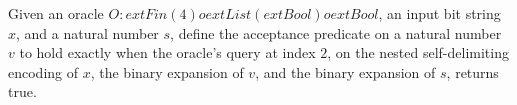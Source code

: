 \begin{definition}
\label{Complexity.LogProg.ISCount.AccO}
\leanok
{}
Given an oracle $O:	ext{Fin}(4)	o	ext{List}(	ext{Bool})	o	ext{Bool}$, an input bit
string $x$, and a natural number $s$, define the acceptance predicate on a natural
number $v$ to hold exactly when the oracle's query at index $2$, on the nested
self-delimiting encoding of $x$, the binary expansion of $v$, and the binary expansion
of $s$, returns true.
\end{definition}
